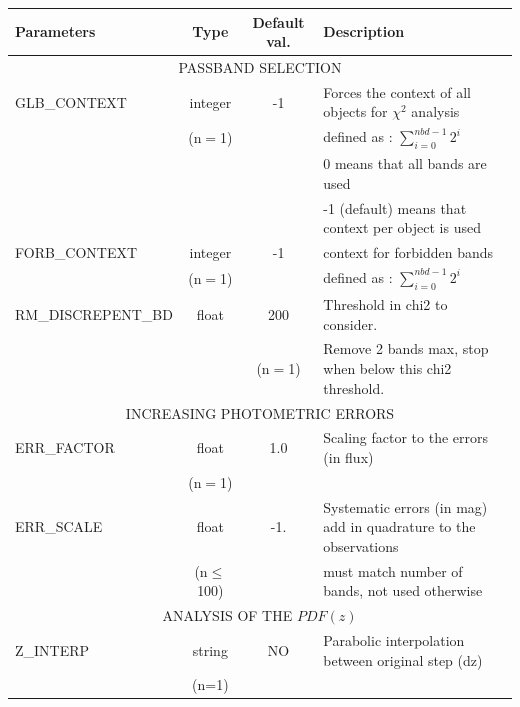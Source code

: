 \documentclass[12pt]{article}
\begin{document}
\begin{tabular}{lccl}
\\[0.5cm]
\textbf{Parameters}     & \textbf{Type}    & \textbf{Default val.} &  \textbf{Description}                                             \\[5pt]
\hline 
            \multicolumn{4}{c}{PASSBAND SELECTION}    \\
\hline 
%
GLB\_CONTEXT   & integer & -1  &  Forces the context of all objects for $\chi^2$ analysis \\
                              & (n$=$1)&      &   defined as : $\sum_{i=0}^{nbd-1} 2^{i}$                \\ 
                              &             &       &   0 means that all bands are used                        \\         
                              &             &       &  -1 (default) means that context per object is used      \\
%
FORB\_CONTEXT & integer & -1 &   context for forbidden bands    \\
                              & (n$=$1) &       &   defined as : $\sum_{i=0}^{nbd-1} 2^{i}$                \\ 
%
RM\_DISCREPENT\_BD & float & 200      &  Threshold in chi2 to consider.   \\
                   &       &  (n$=$1)  & Remove 2 bands max, stop when below this chi2 threshold. \\
\hline
            \multicolumn{4}{c}{INCREASING PHOTOMETRIC ERRORS}   \\
\hline  
%
ERR\_FACTOR  & float        & 1.0   &  Scaling factor to the errors (in flux)  \\
                           & (n$=$1) &         &                                                          \\        
%
ERR\_SCALE      & float          & -1. & Systematic errors (in mag) add in quadrature to the observations \\
                            & (n$\le$100) &      & must match number of bands,  not used otherwise                 \\ 
\hline 
                        \multicolumn{4}{c}{ ANALYSIS OF THE $PDF(z)$} \\
\hline 
% 
Z\_INTERP          & string  &  NO     & Parabolic interpolation between original step (dz)              \\
                            & (n=1)   &         &                                                                   \\

\end{tabular}
\end{document}
